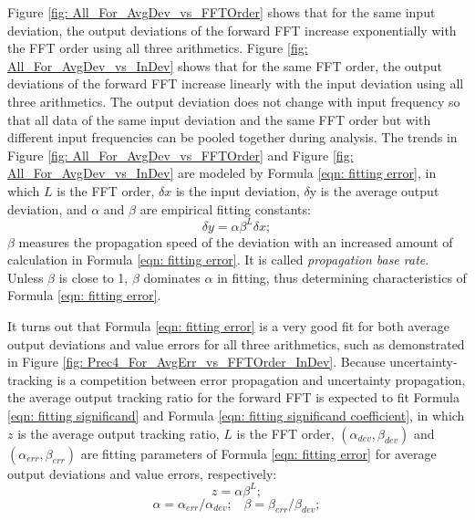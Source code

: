 \documentclass[twoside]{article}
\numberwithin{equation}{section}
\newcommand{\eqspace}{\;\;\;}
\begin{document}
Figure \ref{fig: All_For_AvgDev_vs_FFTOrder} shows that for the same input deviation, the output deviations of the forward FFT increase exponentially with the FFT order using all three arithmetics.  Figure \ref{fig: All_For_AvgDev_vs_InDev} shows that for the same FFT order, the output deviations of the forward FFT increase linearly with the input deviation using all three arithmetics.  The output deviation does not change with input frequency so that all data of the same input deviation and the same FFT order but with different input frequencies can be pooled together during analysis.  The trends in Figure \ref{fig: All_For_AvgDev_vs_FFTOrder} and Figure \ref{fig: All_For_AvgDev_vs_InDev} are modeled by Formula \eqref{eqn: fitting error}, in which $L$ is the FFT order, $\delta x$ is the input deviation, $\delta$y is the average output deviation, and $\alpha$ and $\beta$ are empirical fitting constants: 
\begin{equation}
\label{eqn: fitting error}
\delta y = \alpha \beta ^{L} \delta x;
\end{equation}
$\beta$ measures the propagation speed of the deviation with an increased amount of calculation in Formula \eqref{eqn: fitting error}.  It is called \emph{propagation base rate}.  Unless $\beta$ is close to 1, $\beta$ dominates $\alpha$ in fitting, thus determining characteristics of Formula \eqref{eqn: fitting error}.  

It turns out that Formula \eqref{eqn: fitting error} is a very good fit for both average output deviations and value errors for all three arithmetics, such as demonstrated in Figure \ref{fig: Prec4_For_AvgErr_vs_FFTOrder_InDev}.  Because uncertainty-tracking is a competition between error propagation and uncertainty propagation, the average output tracking ratio for the forward FFT is expected to fit Formula \eqref{eqn: fitting significand} and Formula \eqref{eqn: fitting significand coefficient}, in which $z$ is the average output tracking ratio, $L$ is the FFT order, $(\alpha _{dev}, \beta _{dev})$ and $(\alpha _{err}, \beta _{err})$ are fitting parameters of Formula \eqref{eqn: fitting error} for average output deviations and value errors, respectively:
\begin{equation}
\label{eqn: fitting significand} 
z = \alpha \beta ^{L};
\end{equation}
\begin{equation}
\label{eqn: fitting significand coefficient} 
\alpha = \alpha _{err} / \alpha _{dev}; \eqspace \beta = \beta _{err} / \beta_{dev};
\end{equation}
\end{document}
